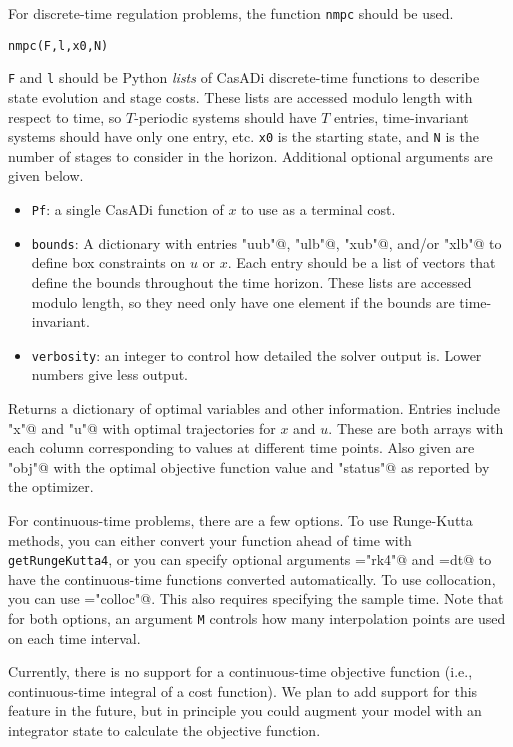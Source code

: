 \documentclass{article}
\newcommand{\funcname}[2][.25em]{\vspace{#1}\noindent\texttt{#2}\nopagebreak\vspace{#1}}
\newcommand{\casadi}{CasADi}
\begin{document}
\begin{multicols}{2}
For discrete-time regulation problems, the function \texttt{nmpc} should be used.

\funcname{nmpc(F,l,x0,N)}

\texttt{F} and \texttt{l} should be Python \emph{lists} of \casadi{} discrete-time functions to describe state evolution and stage costs.
These lists are accessed modulo length with respect to time, so $T$-periodic systems should have $T$ entries, time-invariant systems should have only one entry, etc.
\texttt{x0} is the starting state, and \texttt{N} is the number of stages to consider in the horizon. Additional optional arguments are given below.

\begin{itemize}[noitemsep,nolistsep]
    \item \texttt{Pf}: a single \casadi{} function of $x$ to use as a terminal cost.
    \item \texttt{bounds}: A dictionary with entries \lstinline@"uub"@, \lstinline@"ulb"@, \lstinline@"xub"@, and/or \lstinline@"xlb"@ to define box constraints on $u$ or $x$.
    Each entry should be a list of vectors that define the bounds throughout the time horizon.
    These lists are accessed modulo length, so they need only have one element if the bounds are time-invariant.
    \item \texttt{verbosity}: an integer to control how detailed the solver output is.
    Lower numbers give less output.
\end{itemize}

Returns a dictionary of optimal variables and other information.
Entries include \lstinline@"x"@ and \lstinline@"u"@ with optimal trajectories for $x$ and $u$.
These are both arrays with each column corresponding to values at different time points.
Also given are \lstinline@"obj"@ with the optimal objective function value and \lstinline@"status"@ as reported by the optimizer.

For continuous-time problems, there are a few options.
To use Runge-Kutta methods, you can either convert your function ahead of time with \texttt{getRungeKutta4}, or you can specify optional arguments \lstinline@timemodel="rk4"@ and \lstinline@Delta=dt@ to have the continuous-time functions converted automatically.
To use collocation, you can use \lstinline@timemodel="colloc"@.
This also requires specifying the sample time.
Note that for both options, an argument \texttt{M} controls how many interpolation points are used on each time interval.

Currently, there is no support for a continuous-time objective function (i.e., continuous-time integral of a cost function).
We plan to add support for this feature in the future, but in principle you could augment your model with an integrator state to calculate the objective function.


\end{multicols}
\end{document}
